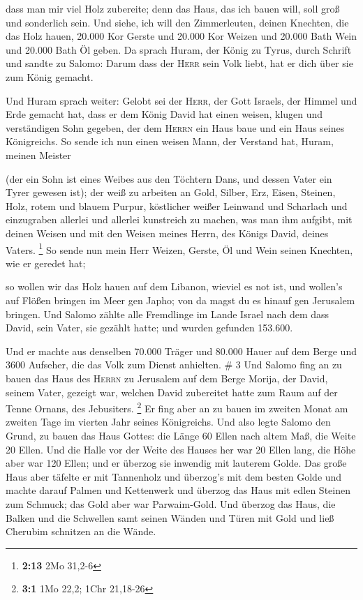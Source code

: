  dass man mir viel Holz zubereite; denn das Haus, das ich
bauen will, soll groß und sonderlich sein.  Und siehe, ich
will den Zimmerleuten, deinen Knechten, die das Holz hauen, 20.000 Kor
Gerste und 20.000 Kor Weizen und 20.000 Bath Wein und 20.000 Bath Öl
geben.  Da sprach Huram, der König zu Tyrus, durch
Schrift und sandte zu Salomo: Darum dass der \textsc{Herr} sein Volk
liebt, hat er dich über sie zum König gemacht.

 Und Huram sprach weiter: Gelobt sei der \textsc{Herr},
der Gott Israels, der Himmel und Erde gemacht hat, dass er dem König
David hat einen weisen, klugen und verständigen Sohn gegeben, der dem
\textsc{Herrn} ein Haus baue und ein Haus seines Königreichs.
 So sende ich nun einen weisen Mann, der Verstand hat,
Huram, meinen Meister

 (der ein Sohn ist eines Weibes aus den Töchtern Dans,
und dessen Vater ein Tyrer gewesen ist); der weiß zu arbeiten an Gold,
Silber, Erz, Eisen, Steinen, Holz, rotem und blauem Purpur, köstlicher
weißer Leinwand und Scharlach und einzugraben allerlei und allerlei
kunstreich zu machen, was man ihm aufgibt, mit deinen Weisen und mit den
Weisen meines Herrn, des Königs David, deines Vaters. \footnote{\textbf{2:13}
  2Mo 31,2-6}  So sende nun mein Herr Weizen, Gerste, Öl
und Wein seinen Knechten, wie er geredet hat;

 so wollen wir das Holz hauen auf dem Libanon, wieviel es
not ist, und wollen's auf Flößen bringen im Meer gen Japho; von da magst
du es hinauf gen Jerusalem bringen.  Und Salomo zählte
alle Fremdlinge im Lande Israel nach dem dass David, sein Vater, sie
gezählt hatte; und wurden gefunden 153.600.

 Und er machte aus denselben 70.000 Träger und 80.000
Hauer auf dem Berge und 3600 Aufseher, die das Volk zum Dienst
anhielten. \# 3  Und Salomo fing an zu bauen das Haus des
\textsc{Herrn} zu Jerusalem auf dem Berge Morija, der David, seinem
Vater, gezeigt war, welchen David zubereitet hatte zum Raum auf der
Tenne Ornans, des Jebusiters. \footnote{\textbf{3:1} 1Mo 22,2; 1Chr
  21,18-26}  Er fing aber an zu bauen im zweiten Monat am
zweiten Tage im vierten Jahr seines Königreichs.  Und also
legte Salomo den Grund, zu bauen das Haus Gottes: die Länge 60 Ellen
nach altem Maß, die Weite 20 Ellen.  Und die Halle vor der
Weite des Hauses her war 20 Ellen lang, die Höhe aber war 120 Ellen; und
er überzog sie inwendig mit lauterem Golde.  Das große
Haus aber täfelte er mit Tannenholz und überzog's mit dem besten Golde
und machte darauf Palmen und Kettenwerk  und überzog das
Haus mit edlen Steinen zum Schmuck; das Gold aber war Parwaim-Gold.
 Und überzog das Haus, die Balken und die Schwellen samt
seinen Wänden und Türen mit Gold und ließ Cherubim schnitzen an die
Wände.


